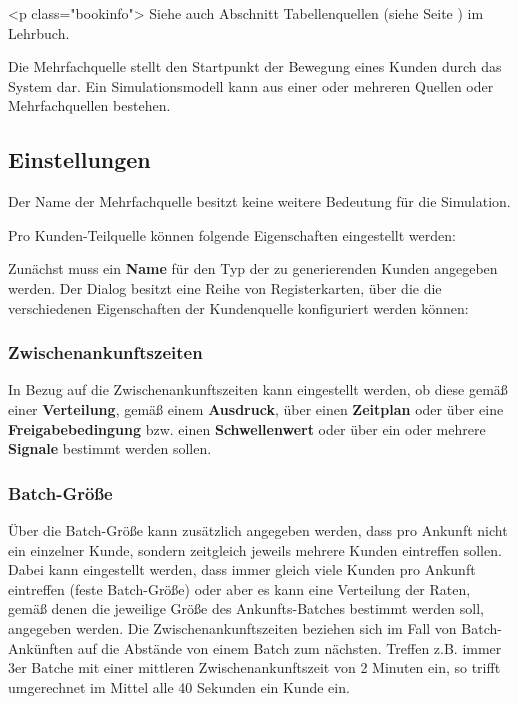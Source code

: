 <p class="bookinfo">
Siehe auch Abschnitt Tabellenquellen (siehe Seite \pageref{ref:book:9.3.1}) im Lehrbuch.

Die Mehrfachquelle stellt den Startpunkt der Bewegung eines Kunden durch das System dar.
Ein Simulationsmodell kann aus einer oder mehreren Quellen oder Mehrfachquellen bestehen.

\subsection*{Einstellungen}

Der Name der Mehrfachquelle besitzt keine weitere Bedeutung für die Simulation.

Pro Kunden-Teilquelle können folgende Eigenschaften eingestellt werden: 

Zunächst muss ein \textbf{Name} für den Typ der zu generierenden Kunden angegeben werden.
Der Dialog besitzt eine Reihe von Registerkarten, über die die verschiedenen Eigenschaften
der Kundenquelle konfiguriert werden können:

\subsubsection*{Zwischenankunftszeiten}

In Bezug auf die Zwischenankunftszeiten kann eingestellt werden, ob diese gemäß einer
\textbf{Verteilung}, gemäß einem \textbf{Ausdruck}, über einen \textbf{Zeitplan} oder über eine
\textbf{Freigabebedingung} bzw. einen \textbf{Schwellenwert} oder über
ein oder mehrere \textbf{Signale} bestimmt werden sollen.

\subsubsection*{Batch-Größe}

Über die Batch-Größe kann zusätzlich
angegeben werden, dass pro Ankunft nicht ein einzelner Kunde, sondern zeitgleich jeweils
mehrere Kunden eintreffen sollen. Dabei kann eingestellt werden, dass immer gleich
viele Kunden pro Ankunft eintreffen (feste Batch-Größe) oder aber es kann eine Verteilung
der Raten, gemäß denen die jeweilige Größe des Ankunfts-Batches bestimmt werden soll,
angegeben werden.
Die Zwischenankunftszeiten beziehen sich im Fall von Batch-Ankünften auf die Abstände von
einem Batch zum nächsten. Treffen z.B. immer 3er Batche mit einer mittleren Zwischenankunftszeit
von 2 Minuten ein, so trifft umgerechnet im Mittel alle 40 Sekunden ein Kunde ein.

